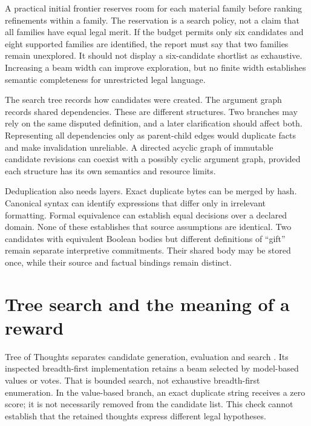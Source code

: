 \documentclass[12pt,a4paper,oneside,openany]{book}
\begin{document}
A practical initial frontier reserves room for each material family before
ranking refinements within a family. The reservation is a search policy, not a
claim that all families have equal legal merit. If the budget permits only six
candidates and eight supported families are identified, the report must say that
two families remain unexplored. It should not display a six-candidate shortlist
as exhaustive. Increasing a beam width can improve exploration, but no finite
width establishes semantic completeness for unrestricted legal language.

The search tree records how candidates were created. The argument graph records
shared dependencies. These are different structures. Two branches may rely on
the same disputed definition, and a later clarification should affect both.
Representing all dependencies only as parent-child edges would duplicate facts
and make invalidation unreliable. A directed acyclic graph of immutable candidate
revisions can coexist with a possibly cyclic argument graph, provided each
structure has its own semantics and resource limits.

Deduplication also needs layers. Exact duplicate bytes can be merged by hash.
Canonical syntax can identify expressions that differ only in irrelevant
formatting. Formal equivalence can establish equal decisions over a declared
domain. None of these establishes that source assumptions are identical. Two
candidates with equivalent Boolean bodies but different definitions of ``gift''
remain separate interpretive commitments. Their shared body may be stored once,
while their source and factual bindings remain distinct.

\section{Tree search and the meaning of a reward}
\label{merge:M05:07}


Tree of Thoughts separates candidate generation, evaluation and search
\citep[section 3]{treeofthoughts2023}. Its inspected breadth-first implementation
retains a beam selected by model-based values or votes. That is bounded search,
not exhaustive breadth-first enumeration. In the value-based branch,
an exact duplicate string receives a zero score; it is not necessarily
removed from the candidate list. This check cannot establish that the
retained thoughts express different legal hypotheses.
\end{document}
